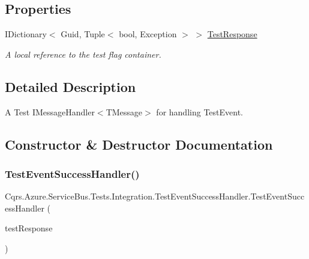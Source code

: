 \subsection*{Properties}
\begin{DoxyCompactItemize}
\item 
I\+Dictionary$<$ Guid, Tuple$<$ bool, Exception $>$ $>$ \hyperlink{classCqrs_1_1Azure_1_1ServiceBus_1_1Tests_1_1Integration_1_1TestEventSuccessHandler_a01443ad3c6558530400b8cff76796fca_a01443ad3c6558530400b8cff76796fca}{Test\+Response}
\begin{DoxyCompactList}\small\item\em A local reference to the test flag container. \end{DoxyCompactList}\end{DoxyCompactItemize}


\subsection{Detailed Description}
A Test I\+Message\+Handler$<$\+T\+Message$>$ for handling Test\+Event. 



\subsection{Constructor \& Destructor Documentation}
\mbox{\label{classCqrs_1_1Azure_1_1ServiceBus_1_1Tests_1_1Integration_1_1TestEventSuccessHandler_ab39bc54e4c49cf338e3c47627d367c72_ab39bc54e4c49cf338e3c47627d367c72}} 
\subsubsection{\texorpdfstring{Test\+Event\+Success\+Handler()}{TestEventSuccessHandler()}}
{\footnotesize\ttfamily Cqrs.\+Azure.\+Service\+Bus.\+Tests.\+Integration.\+Test\+Event\+Success\+Handler.\+Test\+Event\+Success\+Handler (\begin{DoxyParamCaption}\item[{I\+Dictionary$<$ Guid, Tuple$<$ bool, Exception $>$$>$}]{test\+Response }\end{DoxyParamCaption})}



